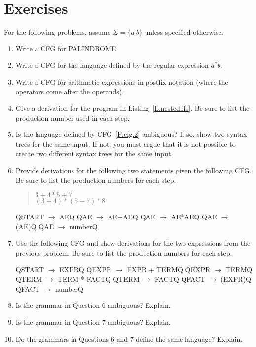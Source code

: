 \documentclass[letterpaper,12pt,openany,reqno]{book}%
\newcommand{\cfgprod}[2] {{\ttfamily #1} $\rightarrow$ {\ttfamily #2}}
\begin{document}
\section{Exercises}
For the following problems, assume $\Sigma = \{a\ b\}$ unless specified otherwise.
\begin{enumerate}
\item Write a CFG for PALINDROME.
\item Write a CFG for the language defined by the regular expression $a^*b$.
\item Write a CFG for arithmetic expressions in postfix notation (where the operators come after the operands).
\item Give a derivation for the program in Listing~\ref{L.nested.ifs}. Be sure to list the production number used in each step.
\item Is the language defined by CFG~\ref{F.cfg.2} ambiguous? If so, show two syntax trees for the same input. If not, you must argue that it is not possible to create two different syntax trees for the same input.
\item Provide derivations for the following two statements given the following CFG. Be sure to list the production numbers for each step.
\begin{quote}
$3+4*5+7$\\
$(3+4)*(5+7)*8$
\end{quote}
\begin{cfg}{}{}
Q\cfgprod{START}{AE}Q
Q\cfgprod{AE}{AE+AE}Q
Q\cfgprod{AE}{AE*AE}Q
Q\cfgprod{AE}{(AE)}Q
Q\cfgprod{AE}{number}Q
\end{cfg}
\item Use the following CFG and show derivations for the two expressions from the previous problem. Be sure to list the production numbers for each step.
\begin{cfgh}
Q\cfgprod{START}{EXPR}Q
Q\cfgprod{EXPR}{EXPR + TERM}Q
Q\cfgprod{EXPR}{TERM}Q
Q\cfgprod{TERM}{TERM * FACT}Q
Q\cfgprod{TERM}{FACT}Q
Q\cfgprod{FACT}{(EXPR)}Q
Q\cfgprod{FACT}{number}Q
\end{cfgh}
\item Is the grammar in Question 6 ambiguous? Explain.
\item Is the grammar in Question 7 ambiguous? Explain.
\item Do the grammars in Questions 6 and 7 define the same language? Explain.

\end{enumerate}
\end{document}
